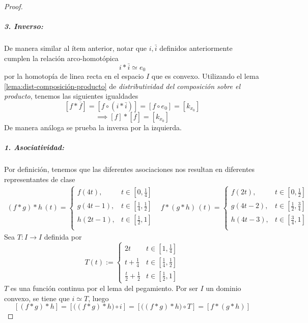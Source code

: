 \begin{proof}
\subparagraph{3. Inverso:} De manera similar al ítem anterior,
notar que \(i, \bar{i}\) definidos anteriormente cumplen la relación
arco-homotópica
\[ i * \bar{i} \simeq e_0 \]
por la homotopía de linea recta en el espacio \(I\) que es convexo.
Utilizando el lema \ref{lema:dist-composición-producto} de
\emph{distributividad del composición sobre el producto}, tenemos las
siguientes igualdades
\[ [f * \overline{f}] = [f \circ (i * \bar{i})] = [f \circ e_0] =
  [k_{x_0}] \]
\[ \implies [f] * [\overline{f}] = [k_{x_0}] \]
De manera análoga se prueba la inversa por la izquierda.

\subparagraph{1. Asociatividad:}
Por definición, tenemos que las diferentes asociaciones nos resultan en
diferentes representantes de clase
\[
  \begin{matrix}
    (f * g) * h \, (t) =
    \begin{cases}
      f (4t), & t \in [0, \frac 1 4] \\
      g (4t - 1), & t \in [\frac 1 4, \frac 1 2] \\
      h (2t - 1), & t \in [\frac 1 2, 1] \\
    \end{cases} &
    f * (g * h) \, (t) =
    \begin{cases}
      f (2t), & t \in [0, \frac 1 2] \\
      g (4t - 2), & t \in [\frac 1 2, \frac 3 4] \\
      h (4t - 3), & t \in [\frac 3 4, 1] \\
    \end{cases}
  \end{matrix}
\]
Sea \(T : I \to I\) definida por
\[ T (t) :=
  \begin{cases}
    2t & t \in [1 , \frac 1 4] \\
    t + \frac 1 4 & t \in [\frac 1 4, \frac 1 2] \\
    \frac t 2 + \frac 1 2 & t \in [\frac 1 2, 1]
  \end{cases}
\]
\(T\) es una función continua por el lema del pegamiento. Por ser \(I\)
un dominio convexo, se tiene que \(i \simeq T\), luego
\[ [(f * g) * h] = [\big( (f * g) * h \big) \circ i] = [\big( (f * g) *
  h \big) \circ T ] = [f * (g * h)] \]
\end{proof}
